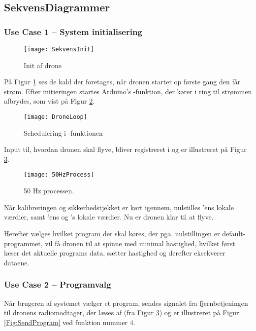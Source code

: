 \documentclass[Main]{subfiles}
\begin{document}
\subsection{SekvensDiagrammer}

\subsubsection{Use Case 1 -- System initialisering}

\begin{figure}[H]
\centering
\texttt{[image: SekvensInit]}
\caption{Init af drone}
\label{Fig:SekvInit}
\end{figure}

På Figur \ref{Fig:SekvInit} ses de kald der foretages, når dronen starter op første gang den får strøm.
Efter initieringen startes Arduino's -funktion, der kører i ring til strømmen afbrydes, som vist på Figur \ref{Fig:SekvDroneHz}.


\begin{figure}[htbp]
\centering
\texttt{[image: DroneLoop]}
\caption{Schedulering i -funktionen}
\label{Fig:SekvDroneHz}
\end{figure}

Input til, hvordan dronen skal flyve, bliver registreret i  og er illustreret på Figur \ref{Fig:50Hz}.

\begin{figure}[H]
\centering
\texttt{[image: 50HzProcess]}
\caption{50 Hz processen. }
\label{Fig:50Hz}
\end{figure}

Når kalibreringen og sikkerhedstjekket er kørt igennem, nulstilles 'ens lokale værdier, samt 'ens og 's lokale værdier.
Nu er dronen klar til at flyve.

Herefter vælges hvilket program der skal køres, der pga. nulstillingen er default-programmet, vil få dronen til at spinne med minimal hastighed, hvilket først læser det aktuelle programs data, sætter hastighed og derefter eksekverer dataene.


\newpage
\subsubsection{Use Case 2 -- Programvalg}
Når brugeren af systemet vælger et program, sendes signalet fra fjernbetjeningen til dronens radiomodtager, der læses af  (fra Figur \ref{Fig:50Hz}) og er illustreret på Figur \ref{Fig:SendProgram} ved funktion nummer 4.
\end{document}
